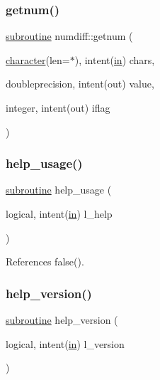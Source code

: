 \subsubsection{\texorpdfstring{getnum()}{getnum()}}
{\footnotesize\ttfamily \hyperlink{M__stopwatch_83_8txt_acfbcff50169d691ff02d4a123ed70482}{subroutine} numdiff\+::getnum (\begin{DoxyParamCaption}\item[{\hyperlink{option__stopwatch_83_8txt_abd4b21fbbd175834027b5224bfe97e66}{character}(len=$\ast$), intent(\hyperlink{M__journal_83_8txt_afce72651d1eed785a2132bee863b2f38}{in})}]{chars,  }\item[{doubleprecision, intent(out)}]{value,  }\item[{integer, intent(out)}]{iflag }\end{DoxyParamCaption})}

\mbox{\label{numdiff_8f90_a3e09a3b52ee8fb04eeb93fe5761626a8}} 
\subsubsection{\texorpdfstring{help\+\_\+usage()}{help\_usage()}}
{\footnotesize\ttfamily \hyperlink{M__stopwatch_83_8txt_acfbcff50169d691ff02d4a123ed70482}{subroutine} help\+\_\+usage (\begin{DoxyParamCaption}\item[{logical, intent(\hyperlink{M__journal_83_8txt_afce72651d1eed785a2132bee863b2f38}{in})}]{l\+\_\+help }\end{DoxyParamCaption})}



References false().

\mbox{\label{numdiff_8f90_a39c21619b08a3c22f19e2306efd7f766}} 
\subsubsection{\texorpdfstring{help\+\_\+version()}{help\_version()}}
{\footnotesize\ttfamily \hyperlink{M__stopwatch_83_8txt_acfbcff50169d691ff02d4a123ed70482}{subroutine} help\+\_\+version (\begin{DoxyParamCaption}\item[{logical, intent(\hyperlink{M__journal_83_8txt_afce72651d1eed785a2132bee863b2f38}{in})}]{l\+\_\+version }\end{DoxyParamCaption})}



